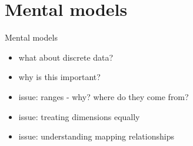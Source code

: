 
\section{Mental models}
\label{sec:mental_models}


Mental models~\cite{Liu:2010a}
\cite{McNeil:2015}

\begin{itemize}
\item what about discrete data?
\item why is this important?
\item issue: ranges - why? where do they come from?
\item issue: treating dimensions equally
\item issue: understanding mapping relationships
\end{itemize}

